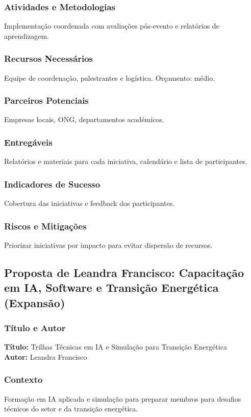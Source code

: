 \documentclass[12pt,a4paper]{article}
\begin{document}
\subsubsection*{Atividades e Metodologias}
Implementação coordenada com avaliações pós-evento e relatórios de aprendizagem.

\subsubsection*{Recursos Necessários}
Equipe de coordenação, palestrantes e logística. Orçamento: médio.

\subsubsection*{Parceiros Potenciais}
Empresas locais, ONG, departamentos académicos.

\subsubsection*{Entregáveis}
Relatórios e materiais para cada iniciativa, calendário e lista de participantes.

\subsubsection*{Indicadores de Sucesso}
Cobertura das iniciativas e feedback dos participantes.

\subsubsection*{Riscos e Mitigações}
Priorizar iniciativas por impacto para evitar dispersão de recursos.

\subsection{Proposta de Leandra Francisco: Capacitação em IA, Software e Transição Energética (Expansão)}

\subsubsection*{Título e Autor}
\textbf{Título:} Trilhas Técnicas em IA e Simulação para Transição Energética \\
\textbf{Autor:} Leandra Francisco

\subsubsection*{Contexto}
Formação em IA aplicada e simulação para preparar membros para desafios técnicos do setor e da transição energética.
\end{document}
